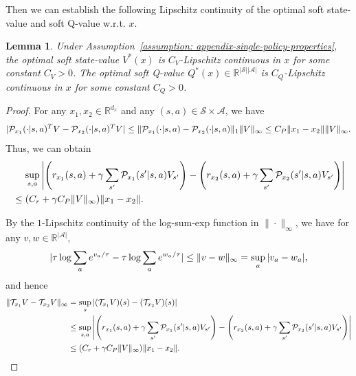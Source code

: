 \documentclass{article}
\theoremstyle{plain}
\newtheorem{lemma}{Lemma}
\theoremstyle{definition}
\theoremstyle{remark}
\def\R{\mathbb R}
\def\cA{\mathcal A}
\def\cP{\mathcal P}
\def\cS{\mathcal S}
\def\cT{\mathcal T}
\begin{document}
Then we can establish the following Lipschitz continuity of the optimal soft state-value and soft Q-value w.r.t. $x$.
\begin{lemma}
    \label{lemma: lipschitz-optimal-value-auxiliary}
    Under Assumption~\ref{assumption: appendix-single-policy-properties}, the optimal soft state-value $V^*(x)$ is $C_V$-Lipschitz continuous in $x$ for some constant $C_V >0$. The optimal soft Q-value $Q^*(x) \in \mathbb{R}^{|\cS||\cA|}$ is $C_Q$-Lipschitz continuous in $x$ for some constant $C_Q>0$.
\end{lemma}
\begin{proof}
    For any $x_1,x_2 \in \R^{d_x}$ and any $(s,a)\in \cS \times \cA$, we have
    \begin{align}
        |\cP_{x_1}(\cdot|s,a)^T V - \cP_{x_2}(\cdot|s,a)^T V | \leq \| \cP_{x_1}(\cdot|s,a) - \cP_{x_2}(\cdot|s,a) \|_1 \| V \|_\infty \leq C_P \|x_1 - x_2\| \| V \|_\infty. \notag
    \end{align}
    Thus, we can obtain
    \begin{align}
        & \quad \, \sup_{s,a} \left|\left(r_{x_1}(s,a) + \gamma \sum_{s^\prime} \cP_{x_1}(s^\prime|s,a) V_{s^\prime}\right) - \left(r_{x_2}(s,a) + \gamma \sum_{s^\prime} \cP_{x_2}(s^\prime|s,a) V_{s^\prime}\right)\right| \notag \\
        & \leq (C_r + \gamma C_P \|V\|_\infty) \|x_1 - x_2\|.
    \end{align}

    By the $1$-Lipschitz continuity of the log-sum-exp function in $\|\cdot\|_\infty$, we have for any $v,w \in \mathbb{R}^{|\cA|}$,
    \begin{align}
        |\tau \log \sum_a e^{v_a/\tau} - \tau \log \sum_a e^{w_a/\tau}| \leq \|v - w\|_\infty = \sup_a |v_a - w_a|, \notag
    \end{align}
    and hence
    \begin{align}
        \| \cT_{x_1} V - \cT_{x_2} V \|_\infty &  = \sup_s |(\cT_{x_1} V)(s) - (\cT_{x_2} V)(s)| \notag\\
        & \leq \sup_{s,a} \left|\left(r_{x_1}(s,a) + \gamma \sum_{s^\prime} \cP_{x_1}(s^\prime|s,a) V_{s^\prime}\right) - \left(r_{x_2}(s,a) + \gamma \sum_{s^\prime} \cP_{x_2}(s^\prime|s,a) V_{s^\prime}\right)\right| \notag \\
        & \leq (C_r + \gamma C_P \|V\|_\infty) \|x_1 - x_2\|.
    \end{align}


\end{proof}
\end{document}
